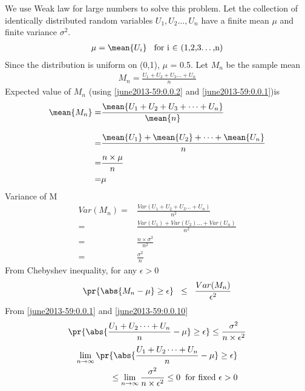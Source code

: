 We use Weak law for large numbers to solve this problem. 
Let the collection of identically distributed random variables $U_1,U_2\dots,U_n$
have a finite mean $\mu$ and finite variance $\sigma^2$.
\begin{align}
    \mu = \mean{U_i} \hspace{0.3cm}\text{for i $\in$ (1,2,3\dots,n)}\label{june2013-59:0.0.1}
\end{align}
Since the distribution is uniform on (0,1), $\mu$ = 0.5. Let $M_n$ be the sample mean
\begin{align}
     M_n = \frac{U_1+U_2+U_3\dots+U_n}{n}\label{june2013-59:0.0.2}
\end{align}
Expected value of $M_n$ (using \eqref{june2013-59:0.0.2} and \eqref{june2013-59:0.0.1})is
\begin{align}
    \mean{M_n} = &\frac{\mean{U_1+U_2+U_3+\dots+U_n}}{\mean{n}}\\[0.3cm]
     = &\frac{\mean{U_1}+\mean{U_2}+\dots+\mean{U_n}}{n}\\
     = &\frac{n\times\mu}{n}\\
     = & \mu
\end{align}
Variance of M
\begin{align}
    Var(M_n) =& \frac{Var(U_1+U_2+U_3\dots+U_n)}{n^2}\\[0.3cm]
    =& \frac{Var(U_1) + Var(U_2)\dots+Var(U_n)}{n^2}\\
    =& \frac{n\times{\sigma^2}}{n^2}\\[0.3cm]
    =& \frac{\sigma^2}{n} \label{june2013-59:0.0.10}
\end{align}
From Chebyshev inequality, for any $\epsilon > 0$
\begin{align}
    \pr{\abs{M_n-\mu}\geq \epsilon} \hspace{0.2cm} \leq \hspace{0.2cm} \frac{Var(M_n)}{\epsilon^2}
\end{align}
From \eqref{june2013-59:0.0.1} and \eqref{june2013-59:0.0.10}
\begin{align}
    \pr{\abs{\frac{U_1+U_2\dots+U_n}{n} - \mu} \geq \epsilon} \leq \frac{\sigma^2}{n\times\epsilon^2}\notag
\end{align}
\begin{align}
    \begin{split}
    \lim_{n \to \infty} \pr{\abs{\frac{U_1+U_2\dots+U_n}{n} - \mu} \geq \epsilon}\\
    \leq \lim_{n \to \infty} \frac{\sigma^2}{n\times\epsilon^2} \leq 0 \hspace{0.2cm} \text{for fixed $\epsilon > 0$}
    \end{split}
\end{align}
